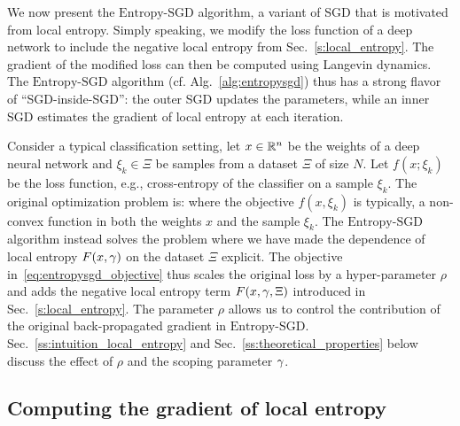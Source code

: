 \documentclass[10pt]{article}
\newcommand{\entropysgd}{\mathrm{Entropy}\textrm{-}\mathrm{SGD}}
\begin{document}
We now present the $\entropysgd$ algorithm, a variant of SGD that is motivated from local entropy. Simply speaking, we modify the loss function of a deep network to include the negative local entropy from Sec.~\ref{s:local_entropy}. The gradient of the modified loss can then be computed using Langevin dynamics. The $\entropysgd$ algorithm (cf. Alg.~\ref{alg:entropysgd}) thus has a strong flavor of ``SGD-inside-SGD'': the outer SGD updates the parameters, while an inner SGD estimates the gradient of local entropy at each iteration.

Consider a typical classification setting, let $x \in \mathbb{R}^n$ be the weights of a deep neural network and $\xi_k \in \Xi$ be samples from a dataset $\Xi$ of size $N$. Let $f(x; \xi_k)$ be the loss function, e.g., cross-entropy of the classifier on a sample $\xi_k$. The original optimization problem is:
where the objective $f(x, \xi_k)$ is typically, a non-convex function in both the weights $x$ and the sample $\xi_k$. The $\entropysgd$ algorithm instead solves the problem
\beq{
    x^*_{\entropysgd} = \argmin_x\ \r\ \rbrac{\f{1}{N}\ \sum_{k=1}^N\ f(x;\ \xi_k)} - F(x, \gamma;\ \Xi);
    \label{eq:entropysgd_objective}
}
where we have made the dependence of local entropy $F(x,\gamma)$ on the dataset $\Xi$ explicit. The objective in~\eqref{eq:entropysgd_objective} thus scales the original loss by a hyper-parameter $\rho$ and adds the negative local entropy term $F(x, \gamma, \Xi)$ introduced in Sec.~\ref{s:local_entropy}. The parameter $\rho$ allows us to control the contribution of the original back-propagated gradient in $\entropysgd$. Sec.~\ref{ss:intuition_local_entropy} and Sec.~\ref{ss:theoretical_properties} below discuss the effect of $\rho$ and the scoping parameter $\gamma$.

\subsection{Computing the gradient of local entropy}
\label{ss:grad_local_entropy}
\end{document}
